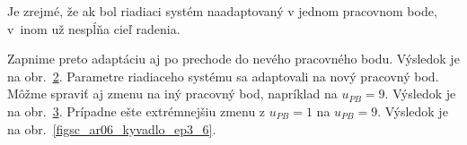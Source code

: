 \documentclass[a4paper, 10pt, ]{article}
\begin{document}
Je zrejmé, že ak bol riadiaci systém naadaptovaný v jednom pracovnom bode, v~inom už nespĺňa cieľ radenia.



Zapnime preto adaptáciu aj po prechode do nevého pracovného bodu. Výsledok je na obr.~\ref{figsc_ar06_kyvadlo_ep3_4}. Parametre riadiaceho systému sa adaptovali na nový pracovný bod. Môžme spraviť aj zmenu na iný pracovný bod, napríklad na  $u_{PB} = 9$. Výsledok je na obr.~\ref{figsc_ar06_kyvadlo_ep3_5}. Prípadne ešte extrémnejšiu zmenu z $u_{PB} = 1$ na  $u_{PB} = 9$. Výsledok je na obr.~\ref{figsc_ar06_kyvadlo_ep3_6}.



\begin{figure}[!t]
	\centering

    \vspace{-3mm}


    \vspace{-2mm}

	\caption{}
	\label{figsc_ar06_kyvadlo_ep3_3}


    \vspace{-2mm}

\end{figure}








\begin{figure}[!t]
	\centering

    \vspace{-3mm}


    \vspace{-2mm}

	\caption{}
	\label{figsc_ar06_kyvadlo_ep3_4}


    \vspace{-2mm}

\end{figure}








\begin{figure}[!t]
	\centering

    \vspace{-3mm}


    \vspace{-2mm}

	\caption{}
	\label{figsc_ar06_kyvadlo_ep3_5}


    \vspace{-2mm}

\end{figure}
\end{document}

